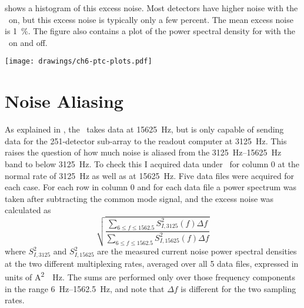  shows a histogram of this excess noise. Most detectors have higher noise with the \PTC\ on, but this excess noise is typically only a few percent. 
The mean excess noise is \SI{1}{\percent}.
The figure also contains a plot of the power spectral density for  with the \PTC\ on and off.

\begin{figure*}
  \centering
\texttt{[image: drawings/ch6-ptc-plots.pdf]}
\caption[Plots showing impact of \PTC\ on noise]{
Plots showing impact of \PTC\ on noise.
\textbf{Left}
Histogram showing excess noise due to the \PTC, defined as ratio of total noise above \SI{6}{\Hz} (see text for precise definition).
More detectors have higher noise with the \PTC\ on than off, but the mean excess noise is only \SI{1}{\percent}.
\textbf{Right}
Current noise for  with \PTC\ on and off, after subtracting common mode noise.
The noise below \SI{30}{\Hz} is 1.5--2.5 times higher with the \PTC\ on, but the total noise at the relevant frequencies of $f >= \SI{6}{\Hz}$ is only \SI{2.9}{\percent}.
}
\label{fig:ch6-ptc-plots}
\end{figure*}

\section{Noise Aliasing} \label{sec:ch6-aliasing}

As explained in , the \MCE\ takes data at \SI{15625}{\hertz}, but is only capable of sending data for the 251-detector sub-array to the readout computer at \SI{3125}{\hertz}.
This raises the question of how much noise is aliased from the \SIrange{3125}{15625}{\hertz} band to below \SI{3125}{\hertz}.
To check this I acquired data under \SOC\ for column 0 at the normal rate of \SI{3125}{\hertz} as well as at \SI{15625}{\hertz}.
Five data files were acquired for each case.
For each row in column 0 and for each data file a power spectrum was taken after subtracting the common mode signal, and the excess noise was calculated as
\begin{equation}
  \sqrt{  \frac{ {\displaystyle \sum_{6 \le f \le 1562.5}} S^2_{I,3125}(f) \Delta f }
               { {\displaystyle \sum_{6 \le f \le 1562.5}} S^2_{I,15625}(f) \Delta f }}
\end{equation}
where $S^2_{I,3125}$ and $S^2_{I,15625}$ are the measured current noise power spectral densities at the two different multiplexing rates, averaged over all 5 data files, expressed in units of \si{\A^2 \per \Hz}.
The sums are performed only over those frequency components in the range \SIrange{6}{1562.5}{\Hz}, and note that $\Delta f$ is different for the two sampling rates.

